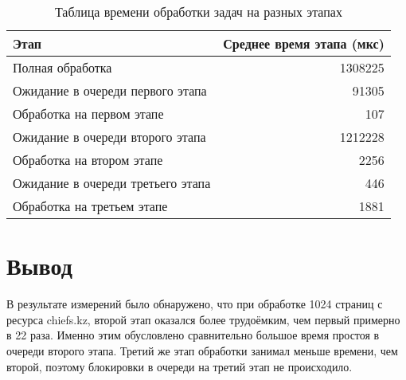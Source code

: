 \begin{table}[h!]
    \caption{Таблица времени обработки задач на разных этапах}
    \label{tbl:results}
    \begin{tabular}{|l|r|}    
        \hline
        Этап & Среднее время этапа (мкс) \\ \hline
        Полная обработка & 1308225 \\ \hline
        Ожидание в очереди первого этапа &91305 \\ \hline
        Обработка на первом этапе & 107 \\ \hline
        Ожидание в очереди второго этапа & 1212228 \\ \hline
        Обработка на втором этапе & 2256 \\ \hline
        Ожидание в очереди третьего этапа & 446 \\ \hline
        Обработка на третьем этапе & 1881 \\ \hline
    \end{tabular}
\end{table}

\section{Вывод}

В результате измерений было обнаружено, что при обработке 1024 страниц с ресурса chiefs.kz, второй этап оказался более трудоёмким, чем первый примерно в 22 раза. Именно этим обусловлено сравнительно большое время простоя в очереди второго этапа. Третий же этап обработки занимал меньше времени, чем второй, поэтому блокировки в очереди на третий этап не происходило.